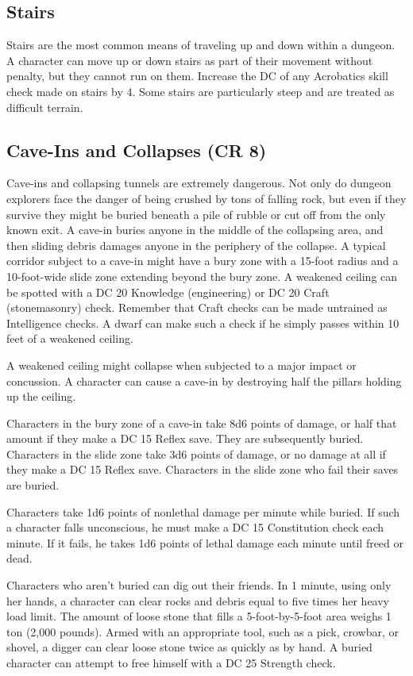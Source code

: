 \subsection{Stairs}

				
Stairs are the most common means of traveling up and down within a dungeon. A character can move up or down stairs as part of their movement without penalty, but they cannot run on them. Increase the DC of any Acrobatics skill check made on stairs by 4. Some stairs are particularly steep and are treated as difficult terrain.
				
\subsection{Cave-Ins and Collapses (CR 8)}

				
Cave-ins and collapsing tunnels are extremely dangerous. Not only do dungeon explorers face the danger of being crushed by tons of falling rock, but even if they survive they might be buried beneath a pile of rubble or cut off from the only known exit. A cave-in buries anyone in the middle of the collapsing area, and then sliding debris damages anyone in the periphery of the collapse. A typical corridor subject to a cave-in might have a bury zone with a 15-foot radius and a 10-foot-wide slide zone extending beyond the bury zone. A weakened ceiling can be spotted with a DC 20 Knowledge (engineering) or DC 20 Craft (stonemasonry) check. Remember that Craft checks can be made untrained as Intelligence checks. A dwarf can make such a check if he simply passes within 10 feet of a weakened ceiling. 
				
A weakened ceiling might collapse when subjected to a major impact or concussion. A character can cause a cave-in by destroying half the pillars holding up the ceiling. 
				
Characters in the bury zone of a cave-in take 8d6 points of damage, or half that amount if they make a DC 15 Reflex save. They are subsequently buried. Characters in the slide zone take 3d6 points of damage, or no damage at all if they make a DC 15 Reflex save. Characters in the slide zone who fail their saves are buried.
				
Characters take 1d6 points of nonlethal damage per minute while buried. If such a character falls unconscious, he must make a DC 15 Constitution check each minute. If it fails, he takes 1d6 points of lethal damage each minute until freed or dead.
				
Characters who aren't buried can dig out their friends. In 1 minute, using only her hands, a character can clear rocks and debris equal to five times her heavy load limit. The amount of loose stone that fills a 5-foot-by-5-foot area weighs 1 ton (2,000 pounds). Armed with an appropriate tool, such as a pick, crowbar, or shovel, a digger can clear loose stone twice as quickly as by hand. A buried character can attempt to free himself with a DC 25 Strength check.
				
